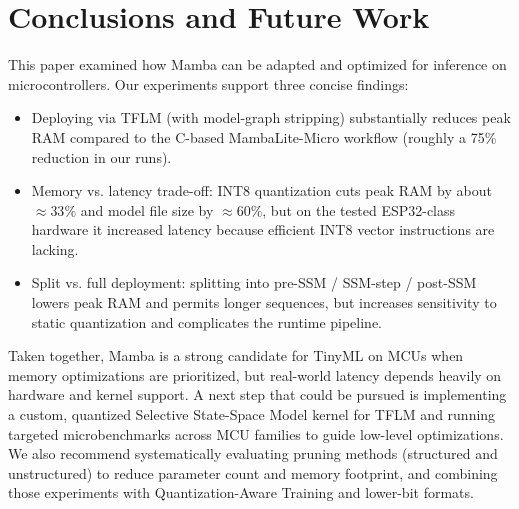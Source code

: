 \section{Conclusions and Future Work}
\label{sec:conclusion}

This paper examined how Mamba can be adapted and optimized for inference on microcontrollers. Our experiments support three concise findings:

\begin{itemize}
  \item Deploying via TFLM (with model-graph stripping) substantially reduces peak RAM compared to the C-based MambaLite-Micro workflow (roughly a 75\% reduction in our runs).
  \item Memory vs. latency trade-off: INT8 quantization cuts peak RAM by about $\approx33\%$ and model file size by $\approx60\%$, but on the tested ESP32-class hardware it increased latency because efficient INT8 vector instructions are lacking.
  \item Split vs. full deployment: splitting into pre-SSM / SSM-step / post-SSM lowers peak RAM and permits longer sequences, but increases sensitivity to static quantization and complicates the runtime pipeline.
\end{itemize}

Taken together, Mamba is a strong candidate for TinyML on MCUs when memory optimizations are prioritized, but real-world latency depends heavily on hardware and kernel support. A next step that could be pursued is implementing a custom, quantized Selective State-Space Model kernel for TFLM and running targeted microbenchmarks across MCU families to guide low-level optimizations. We also recommend systematically evaluating pruning methods (structured and unstructured) to reduce parameter count and memory footprint, and combining those experiments with Quantization-Aware Training and lower-bit formats.
